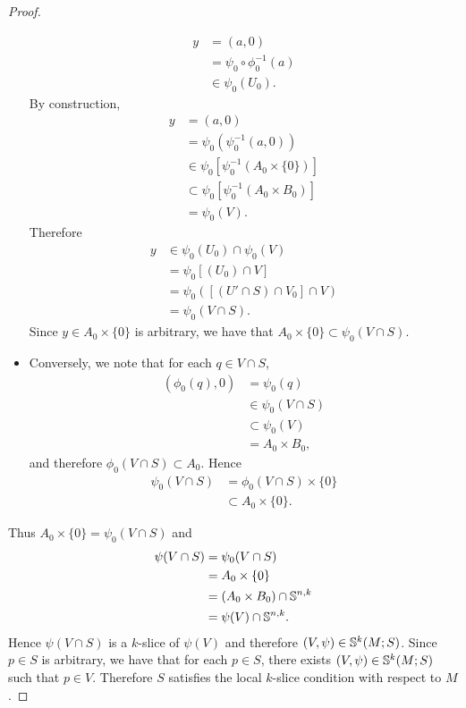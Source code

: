 \documentclass{book}
\begin{document}
\begin{proof}
\begin{itemize}
			\begin{align*}
				y
				& = (a, 0) \\
				& = \psi_0 \circ \phi_0^{-1}(a) \\
				& \in \psi_0(U_0).
			\end{align*} 
			By construction,
			\begin{align*}
				y
				& = (a, 0) \\
				& = \psi_0(\psi_0^{-1}(a,0)) \\
				& \in \psi_0[\psi_0^{-1}(A_0 \times \{0\})] \\
				& \subset \psi_0[\psi_0^{-1}(A_0 \times B_0)] \\
				& = \psi_0(V) .
			\end{align*}
			Therefore 
			\begin{align*}
				y
				& \in \psi_0(U_0) \cap \psi_0(V)  \\
				& = \psi_0[(U_0) \cap V] \\
				& = \psi_0([(U' \cap S) \cap V_0] \cap V) \\
				& = \psi_0(V \cap S).
			\end{align*}
			Since $y \in A_0 \times \{0\}$ is arbitrary, we have that $A_0 \times \{0\} \subset \psi_0(V \cap S)$.  
			\item Conversely, we note that for each $q \in V \cap S$, 
			\begin{align*}
				(\phi_0(q), 0)
				& =  \psi_0(q) \\
				& \in \psi_0(V \cap S) \\
				& \subset \psi_0(V) \\
				& = A_0 \times B_0, 
			\end{align*}
			and therefore $\phi_0(V \cap S) \subset A_0$. Hence 
			\begin{align*}
				\psi_0(V \cap S)
				& = \phi_0(V \cap S) \times \{0\} \\
				& \subset A_0 \times \{0\}.
			\end{align*}
		\end{itemize}
		Thus $A_0 \times \{0\} = \psi_0(V \cap S)$ and 
		\begin{align*}
			\psi(V \cap S)
			& = \psi_0(V \cap S) \\
			& = A_0 \times \{0\} \\
			& = (A_0 \times B_0) \cap \S^{n,k} \\
			& = \psi(V) \cap \S^{n,k}.
		\end{align*}
		Hence $\psi(V \cap S)$ is a $k$-slice of $\psi(V)$ and therefore $(V, \psi) \in \S^k(M; S)$. Since $p \in S$ is arbitrary, we have that for each $p \in S$, there exists $(V, \psi) \in \S^k(M; S)$ such that $p \in V$. Therefore $S$ satisfies the local $k$-slice condition with respect to $M$. 
	\end{proof}
\end{document}
